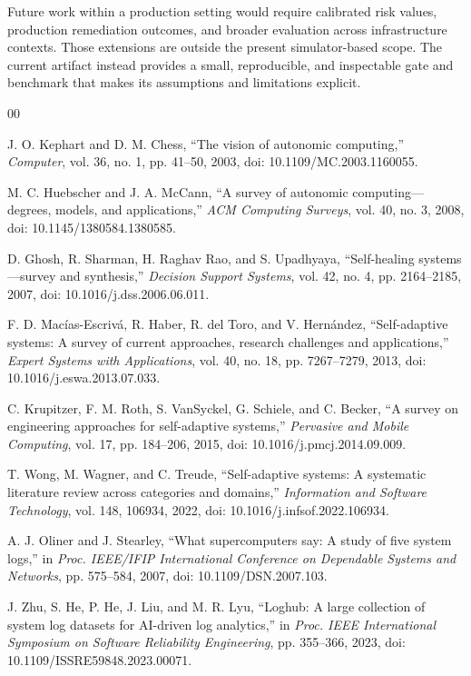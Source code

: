 \documentclass[conference]{IEEEtran}
\begin{document}
Future work within a production setting would require calibrated risk values,
production remediation outcomes, and broader evaluation across infrastructure
contexts. Those extensions are outside the present simulator-based scope. The
current artifact instead provides a small, reproducible, and inspectable gate
and benchmark that makes its assumptions and limitations explicit.

\begin{thebibliography}{00}

J. O. Kephart and D. M. Chess,
``The vision of autonomic computing,''
\textit{Computer}, vol. 36, no. 1, pp. 41--50, 2003,
doi: 10.1109/MC.2003.1160055.

M. C. Huebscher and J. A. McCann,
``A survey of autonomic computing---degrees, models, and applications,''
\textit{ACM Computing Surveys}, vol. 40, no. 3, 2008,
doi: 10.1145/1380584.1380585.

D. Ghosh, R. Sharman, H. Raghav Rao, and S. Upadhyaya,
``Self-healing systems---survey and synthesis,''
\textit{Decision Support Systems}, vol. 42, no. 4, pp. 2164--2185, 2007,
doi: 10.1016/j.dss.2006.06.011.

F. D. Macías-Escrivá, R. Haber, R. del Toro, and V. Hernández,
``Self-adaptive systems: A survey of current approaches, research challenges
and applications,''
\textit{Expert Systems with Applications}, vol. 40, no. 18,
pp. 7267--7279, 2013, doi: 10.1016/j.eswa.2013.07.033.

C. Krupitzer, F. M. Roth, S. VanSyckel, G. Schiele, and C. Becker,
``A survey on engineering approaches for self-adaptive systems,''
\textit{Pervasive and Mobile Computing}, vol. 17, pp. 184--206, 2015,
doi: 10.1016/j.pmcj.2014.09.009.

T. Wong, M. Wagner, and C. Treude,
``Self-adaptive systems: A systematic literature review across categories and
domains,''
\textit{Information and Software Technology}, vol. 148, 106934, 2022,
doi: 10.1016/j.infsof.2022.106934.

A. J. Oliner and J. Stearley,
``What supercomputers say: A study of five system logs,''
in \textit{Proc. IEEE/IFIP International Conference on Dependable Systems and
Networks}, pp. 575--584, 2007, doi: 10.1109/DSN.2007.103.

J. Zhu, S. He, P. He, J. Liu, and M. R. Lyu,
``Loghub: A large collection of system log datasets for AI-driven log analytics,''
in \textit{Proc. IEEE International Symposium on Software Reliability Engineering},
pp. 355--366, 2023, doi: 10.1109/ISSRE59848.2023.00071.


\end{thebibliography}
\end{document}
